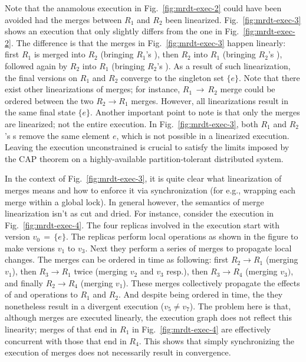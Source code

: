 Note that the anamolous execution in Fig.~\ref{fig:mrdt-exec-2} could
have been avoided had the merges between $R_1$ and $R_2$ been
linearized. Fig.~\ref{fig:mrdt-exec-3} shows an execution that only
slightly differs from the one in Fig.~\ref{fig:mrdt-exec-2}. The
difference is that the merges in Fig.~\ref{fig:mrdt-exec-3} happen
linearly: first $R_1$ is merged into $R_2$ (bringing $R_1$'s
), then $R_2$ into $R_1$ (bringing $R_2$'s ),
followed again by $R_2$ into $R_1$ (bringing $R_2$'s ). As a
result of such linearization, the final versions on $R_1$ and $R_2$
converge to the singleton set $\{e\}$. Note that there exist other
linearizations of merges; for instance, $R_1 \,\rightarrow\, R_2$
merge could be ordered between the two $R_2 \rightarrow R_1$ merges.
However, all linearizations result in the same final state $\{e\}$.
Another important point to note is that only the merges are
linearized; not the entire execution. In Fig.~\ref{fig:mrdt-exec-3},
both $R_1$ and $R_2$'s s remove the same element $e$, which
is not possible in a linearized execution. Leaving the execution
unconstrained is crucial to satisfy the limits imposed by the CAP
theorem on a highly-available partition-tolerant distributed system.

In the context of Fig.~\ref{fig:mrdt-exec-3}, it is quite clear what
linearization of merges means and how to enforce it via
synchronization (for e.g., wrapping each merge within a global lock).
In general however, the semantics of merge linearization isn't as cut
and dried. For instance, consider the execution in
Fig.~\ref{fig:mrdt-exec-4}. The four replicas involved in the
execution start with version $v_0 \,=\, \{e\}$. The replicas perform
local operations as shown in the figure to make versions $v_1$ to
$v_3$. Next they perform a series of merges to propagate local
changes. The merges can be ordered in time as following: first $R_2
\rightarrow R_1$ (merging $v_1$), then $R_3 \rightarrow R_1$ twice
(merging $v_2$ and $v_3$ resp.), then $R_3 \rightarrow R_4$ (merging
$v_3)$, and finally $R_2 \rightarrow R_4$ (merging $v_1$). These
merges collectively propagate the effects of  and 
operations to $R_1$ and $R_2$. And despite being ordered in time, the
they nonetheless result in a divergent execution ($v_5 \neq v_7$). The
problem here is that, although merges are executed linearly, the
execution graph does not reflect this linearity; merges of that end in
$R_1$ in Fig.~\ref{fig:mrdt-exec-4} are effectively concurrent with
those that end in $R_4$. This shows that simply synchronizing the
execution of merges does not necessarily result in convergence.

